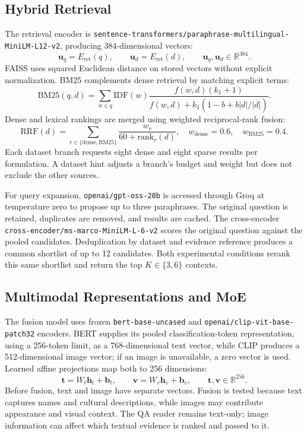 \documentclass[10pt,a4paper]{article}
\newcommand{\R}{\mathbb{R}}
\newcommand{\model}[1]{\texttt{\small #1}}
\begin{document}
\subsection{Hybrid Retrieval}
The retrieval encoder is \model{sentence-transformers/paraphrase-multilingual-MiniLM-L12-v2}, producing 384-dimensional vectors:
\begin{equation}
\mathbf{u}_{q}=E_{\mathrm{ret}}(q),\qquad
\mathbf{u}_{d}=E_{\mathrm{ret}}(d),\qquad \mathbf{u}_{q},\mathbf{u}_{d}\in\R^{384}.
\end{equation}
FAISS uses squared Euclidean distance on stored vectors without explicit normalization. BM25 complements dense retrieval by matching explicit terms:
\begin{equation}
\mathrm{BM25}(q,d)=\sum_{w\in q}\mathrm{IDF}(w)
\frac{f(w,d)(k_1+1)}
{f(w,d)+k_1(1-b+b|d|/\overline{|d|})}.
\end{equation}
Dense and lexical rankings are merged using weighted reciprocal-rank fusion:
\begin{equation}
\mathrm{RRF}(d)=
\sum_{r\in\{\mathrm{dense},\mathrm{BM25}\}}
\frac{w_r}{60+\mathrm{rank}_r(d)},\quad
w_{\mathrm{dense}}=0.6,\quad w_{\mathrm{BM25}}=0.4.
\end{equation}
Each dataset branch requests eight dense and eight sparse results per formulation. A dataset hint adjusts a branch's budget and weight but does not exclude the other sources.

For query expansion, \model{openai/gpt-oss-20b} is accessed through Groq at temperature zero to propose up to three paraphrases. The original question is retained, duplicates are removed, and results are cached. The cross-encoder \model{cross-encoder/ms-marco-MiniLM-L-6-v2} scores the original question against the pooled candidates. Deduplication by dataset and evidence reference produces a common shortlist of up to 12 candidates. Both experimental conditions rerank this same shortlist and return the top $K\in\{3,6\}$ contexts.

\subsection{Multimodal Representations and MoE}
The fusion model uses frozen \model{bert-base-uncased} \cite{bert} and \model{openai/clip-vit-base-patch32} encoders. BERT supplies its pooled classification-token representation, using a 256-token limit, as a 768-dimensional text vector, while CLIP produces a 512-dimensional image vector; if an image is unavailable, a zero vector is used. Learned affine projections map both to 256 dimensions:
\begin{equation}
\mathbf{t}=W_t\mathbf{h}_t+\mathbf{b}_t,\qquad
\mathbf{v}=W_v\mathbf{h}_v+\mathbf{b}_v,\qquad
\mathbf{t},\mathbf{v}\in\R^{256}.
\end{equation}
Before fusion, text and image have separate vectors. Fusion is tested because text captures names and cultural descriptions, while images may contribute appearance and visual context. The QA reader remains text-only; image information can affect which textual evidence is ranked and passed to it.
\end{document}
